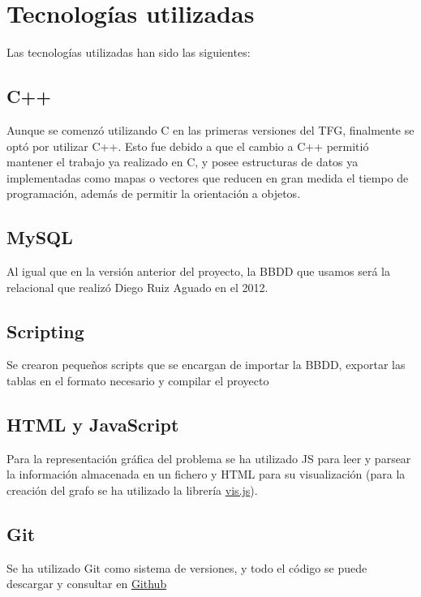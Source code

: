 \section{Tecnologías utilizadas}
Las tecnologías utilizadas han sido las siguientes:

\subsection{C++}
Aunque se comenzó utilizando C en las primeras versiones del TFG, finalmente se optó por utilizar C++. Esto fue debido a que el cambio a C++ permitió mantener el trabajo ya realizado en C, y posee estructuras de datos ya implementadas como mapas o vectores que reducen en gran medida el tiempo de programación, además de permitir la orientación a objetos.

\subsection{MySQL}
Al igual que en la versión anterior del proyecto, la BBDD que usamos será la relacional que realizó Diego Ruiz Aguado en el 2012.

\subsection{Scripting}
Se crearon pequeños scripts que se encargan de importar la BBDD, exportar las tablas en el formato necesario y compilar el proyecto

\subsection{HTML y JavaScript}
Para la representación gráfica del problema se ha utilizado JS para leer y parsear la información almacenada en un fichero y HTML para su visualización (para la creación del grafo se ha utilizado la librería \href{http://visjs.org/docs/network/}{vis.js}).

\subsection{Git}
Se ha utilizado Git como sistema de versiones, y todo el código se puede descargar y consultar en  \href{https://github.com/cavasanchez/TFG}{Github}



